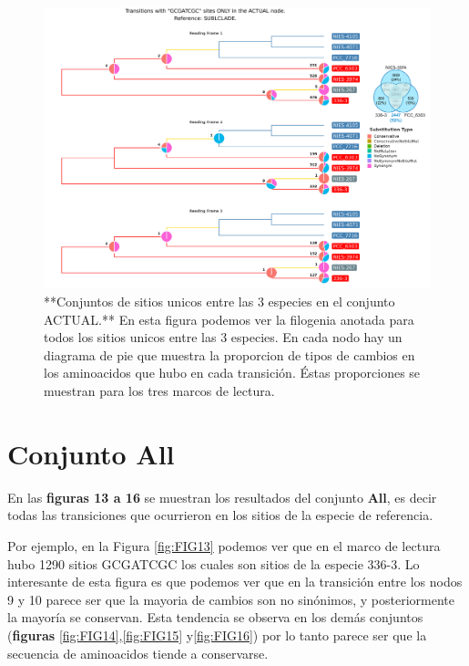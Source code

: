 \documentclass[
]{book}
\begin{document}
\begin{figure}

{\centering \includegraphics[width=1.2\linewidth]{Clados/Calothrix_B/figures/A/GCGATCGC/Actual/SUBCLADE_Actual_A_tree} 

}

\caption{**Conjuntos de sitios unicos entre las 3 especies en el conjunto ACTUAL.** En esta figura podemos ver la filogenia anotada para todos los sitios unicos entre las 3 especies. En cada nodo hay un diagrama de pie que muestra la proporcion de tipos de cambios en los aminoacidos que hubo en cada transición. Éstas proporciones se muestran para los tres marcos de lectura.}\label{fig:FIG12}
\end{figure}

\hypertarget{conjunto-all}{%
\section{Conjunto All}\label{conjunto-all}}

En las \textbf{figuras 13 a 16} se muestran los resultados del conjunto \textbf{All}, es decir todas las transiciones que ocurrieron en los sitios de la especie de referencia.

Por ejemplo, en la Figura \ref{fig:FIG13} podemos ver que en el marco de lectura hubo 1290 sitios GCGATCGC los cuales son sitios de la especie 336-3. Lo interesante de esta figura es que podemos ver que en la transición entre los nodos 9 y 10 parece ser que la mayoria de cambios son no sinónimos, y posteriormente la mayoría se conservan. Esta tendencia se observa en los demás conjuntos (\textbf{figuras} \ref{fig:FIG14},\ref{fig:FIG15} y\ref{fig:FIG16}) por lo tanto parece ser que la secuencia de aminoacidos tiende a conservarse.
\end{document}
